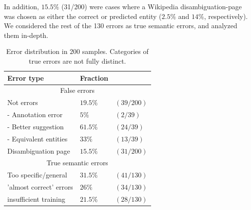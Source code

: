 \documentclass[11pt]{article}
\begin{document}
	In addition, $15.5\%$ (31/200) were cases where a Wikipedia disambiguation-page was chosen as either the correct or predicted entity ($2.5\%$ and $14\%$, respectively). We considered the rest of the 130 errors as true semantic errors, and analyzed them in-depth.
	
	\begin{table}[ht]
		\begin{center}
			\begin{tabular}{|p{3.5cm}| ll |}
				\hline \bf Error type 		& \bf Fraction  	&\\ 
				\hline \multicolumn{3}{|c|}{False errors} \\
				\hline Not errors 			& $19.5\%$ 	& $(39/200)$  \\ 
				- Annotation error 			& $5\%$    	& $(2/39)$ \\ 
				- Better suggestion			& $61.5\%$ 	&$(24/39)$ \\
			    - Equivalent entities		& $ 33\%$ 	&$(13/39)$ \\ 
				Disambiguation page			& $15.5\%$   	&$(31/200)$ \\ 
				\hline \multicolumn{3}{|c|}{True semantic errors} \\
				\hline	Too specific/general  	& $31.5\%$ 	&$(41/130)$ \\ 
				'almost correct' errors		& $26\%$ 	&$(34/130)$ \\ 
				insufficient training		& $21.5\%$ &$(28/130)$ \\
				\hline
			\end{tabular}
		\end{center}
		\caption{\label{tab:d} Error distribution in $200$ samples. Categories of true errors are not fully distinct.}
	\end{table}
	
\end{document}
